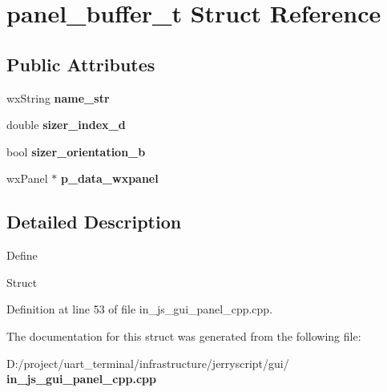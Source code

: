 \section{panel\+\_\+buffer\+\_\+t Struct Reference}
\label{structpanel__buffer__t}
\subsection*{Public Attributes}
\begin{DoxyCompactItemize}
\item 
\mbox{\label{structpanel__buffer__t_ac879d89d4bf92239321667960cfd852c}} 
wx\+String {\bfseries name\+\_\+str}
\item 
\mbox{\label{structpanel__buffer__t_adc823503caaca1d65b8bfa399d437b62}} 
double {\bfseries sizer\+\_\+index\+\_\+d}
\item 
\mbox{\label{structpanel__buffer__t_aa46be337a32cd1a77dbbb6d02c1146fe}} 
bool {\bfseries sizer\+\_\+orientation\+\_\+b}
\item 
\mbox{\label{structpanel__buffer__t_a258bde5e898415afd9f4086c6971436a}} 
wx\+Panel $\ast$ {\bfseries p\+\_\+data\+\_\+wxpanel}
\end{DoxyCompactItemize}


\subsection{Detailed Description}
Define

Struct 

Definition at line 53 of file in\+\_\+js\+\_\+gui\+\_\+panel\+\_\+cpp.\+cpp.



The documentation for this struct was generated from the following file\+:\begin{DoxyCompactItemize}
\item 
D\+:/project/uart\+\_\+terminal/infrastructure/jerryscript/gui/\textbf{ in\+\_\+js\+\_\+gui\+\_\+panel\+\_\+cpp.\+cpp}\end{DoxyCompactItemize}

